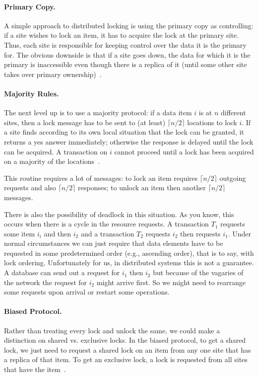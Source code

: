 \paragraph{Primary Copy.}A simple approach to distributed locking is using the primary copy as controlling: if a site wishes to lock an item, it has to acquire the lock at the primary site. Thus, each site is responsible for keeping control over the data it is the primary for. The obvious downside is that if a site goes down, the data for which it is the primary is inaccessible even though there is a replica of it (until some other site takes over primary ownership)~\cite{dsc}.

\paragraph{Majority Rules.} The next level up is to use a majority protocol: if a data item $i$ is at $n$ different sites, then a lock message has to be sent to (at least) $\lceil n/2 \rceil$ locations to lock $i$. If a site finds according to its own local situation that the lock can be granted, it returns a yes answer immediately; otherwise the response is delayed until the lock can be acquired. A transaction on $i$ cannot proceed until a lock has been acquired on a majority of the locations~\cite{dsc}.

This routine requires a lot of messages: to lock an item requires $\lceil n/2 \rceil$ outgoing requests and also  $\lceil n/2 \rceil$ responses; to unlock an item then another $\lceil n/2 \rceil$ messages.

There is also the possibility of deadlock in this situation. As you know, this occurs when there is a cycle in the resource requests. A transaction $T_{1}$ requests some item $i_{i}$ and then $i_{2}$ and a transaction $T_{2}$ requests $i_{2}$ then requests $i_{1}$. Under normal circumstances we can just require that data elements have to be requested in some predetermined order (e.g., ascending order), that is to say, with lock ordering. Unfortunately for us, in distributed systems this is not a guarantee. A database can send out a request for $i_{1}$ then $i_{2}$ but because of the vagaries of the network the request for $i_{2}$ might arrive first. So we might need to rearrange some requests upon arrival or restart some operations.

\paragraph{Biased Protocol.} Rather than treating every lock and unlock the same, we could make a distinction on shared vs. exclusive locks. In the biased protocol, to get a shared lock, we just need to request a shared lock on an item from any one site that has a replica of that item. To get an exclusive lock, a lock is requested from all sites that have the item~\cite{dsc}.

